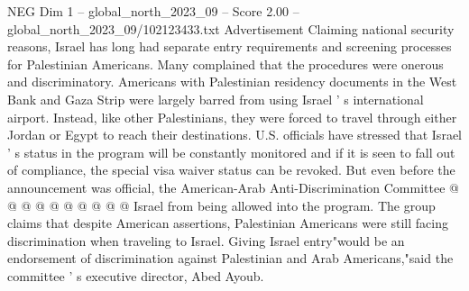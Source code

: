 \begin{textsample}{NEG Dim 1 – global\_north\_2023\_09 – Score 2.00 – global\_north\_2023\_09/102123433.txt}
Advertisement Claiming national security reasons, Israel has long had separate entry requirements and screening processes for Palestinian Americans.
Many complained that the procedures were onerous and discriminatory.
Americans with Palestinian residency documents in the West Bank and Gaza Strip were largely barred from using Israel ' s international airport.
Instead, like other Palestinians, they were forced to travel through either Jordan or Egypt to reach their destinations.
U.S. officials have stressed that Israel ' s status in the program will be constantly monitored and if it is seen to fall out of compliance, the special visa waiver status can be revoked.
But even before the announcement was official, the American-Arab Anti-Discrimination Committee @ @ @ @ @ @ @ @ @ @ Israel from being allowed into the program.
The group claims that despite American assertions, Palestinian Americans were still facing discrimination when traveling to Israel.
Giving Israel entry"would be an endorsement of discrimination against Palestinian and Arab Americans,"said the committee ' s executive director, Abed Ayoub.

\end{textsample}
